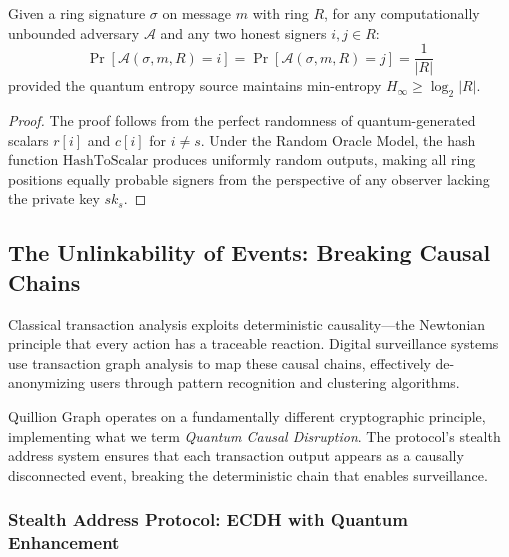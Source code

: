 \documentclass[11pt,a4paper]{article}
\begin{document}
\begin{theorem}
Given a ring signature $\sigma$ on message $m$ with ring $R$, for any computationally unbounded adversary $\mathcal{A}$ and any two honest signers $i, j \in R$:
$$\Pr[\mathcal{A}(\sigma, m, R) = i] = \Pr[\mathcal{A}(\sigma, m, R) = j] = \frac{1}{|R|}$$
provided the quantum entropy source maintains min-entropy $H_\infty \geq \log_2|R|$.
\end{theorem}

\begin{proof}
The proof follows from the perfect randomness of quantum-generated scalars $r[i]$ and $c[i]$ for $i \neq s$. Under the Random Oracle Model, the hash function $\text{HashToScalar}$ produces uniformly random outputs, making all ring positions equally probable signers from the perspective of any observer lacking the private key $sk_s$.
\end{proof}

\subsection{The Unlinkability of Events: Breaking Causal Chains}

Classical transaction analysis exploits deterministic causality—the Newtonian principle that every action has a traceable reaction. Digital surveillance systems use transaction graph analysis to map these causal chains, effectively de-anonymizing users through pattern recognition and clustering algorithms.

Quillion Graph operates on a fundamentally different cryptographic principle, implementing what we term \textit{Quantum Causal Disruption}. The protocol's stealth address system ensures that each transaction output appears as a causally disconnected event, breaking the deterministic chain that enables surveillance.

\subsubsection{Stealth Address Protocol: ECDH with Quantum Enhancement}
\end{document}
